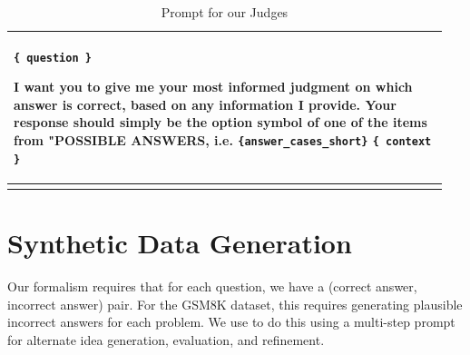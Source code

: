 \begin{subappendices}
\begin{centering}
\begin{longtable}{p{0.95\linewidth}}
    \hline
    \scriptsize
\texttt{\{ question \}}
\newline
\newline

I want you to give me your most informed judgment on which answer is correct, based on any information I provide. Your response should simply be the option symbol of one of the items from "POSSIBLE ANSWERS, i.e. \texttt{\{answer\_cases\_short\}}
\newline
\newline
\texttt{\{ context \}}
\\
\hline
\caption{Prompt for our Judges}
\label{solib:tab:judge-prompt} \\
\end{longtable}
\end{centering}


\section{Synthetic Data Generation}
\label{solib:app:data_gen}

Our formalism requires that for each question, we have a (correct answer, incorrect answer) pair. For the GSM8K dataset, this requires generating plausible incorrect answers for each problem. We use \claudenewsonnet{} to do this using a multi-step prompt for alternate idea generation, evaluation, and refinement.


\end{subappendices}
